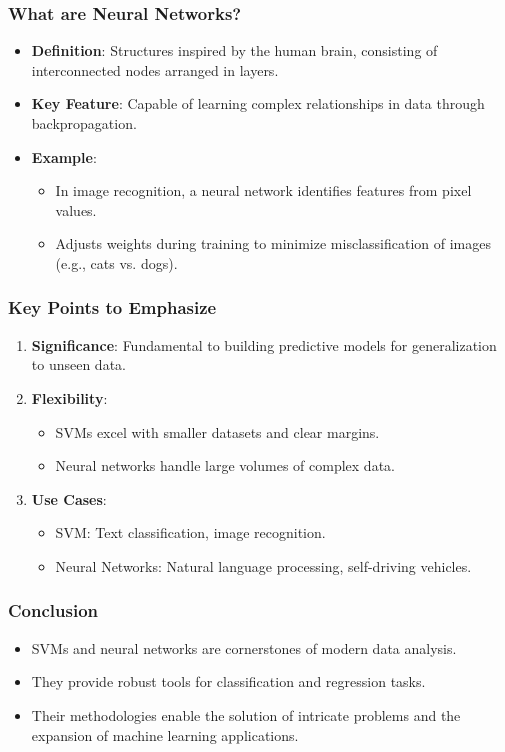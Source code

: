 \documentclass[aspectratio=169]{beamer}
\begin{document}
\begin{frame}[fragile]
  \frametitle{What are Neural Networks?}
  \begin{itemize}
    \item \textbf{Definition}: Structures inspired by the human brain, consisting of interconnected nodes arranged in layers.
    \item \textbf{Key Feature}: Capable of learning complex relationships in data through backpropagation.
    \item \textbf{Example}:
      \begin{itemize}
        \item In image recognition, a neural network identifies features from pixel values.
        \item Adjusts weights during training to minimize misclassification of images (e.g., cats vs. dogs).
      \end{itemize}
  \end{itemize}
\end{frame}

\begin{frame}[fragile]
  \frametitle{Key Points to Emphasize}
  \begin{enumerate}
    \item \textbf{Significance}: Fundamental to building predictive models for generalization to unseen data.
    \item \textbf{Flexibility}:
      \begin{itemize}
        \item SVMs excel with smaller datasets and clear margins.
        \item Neural networks handle large volumes of complex data.
      \end{itemize}
    \item \textbf{Use Cases}:
      \begin{itemize}
        \item SVM: Text classification, image recognition.
        \item Neural Networks: Natural language processing, self-driving vehicles.
      \end{itemize}
  \end{enumerate}
\end{frame}

\begin{frame}[fragile]
  \frametitle{Conclusion}
  \begin{itemize}
    \item SVMs and neural networks are cornerstones of modern data analysis.
    \item They provide robust tools for classification and regression tasks.
    \item Their methodologies enable the solution of intricate problems and the expansion of machine learning applications.
  \end{itemize}
\end{frame}
\end{document}
